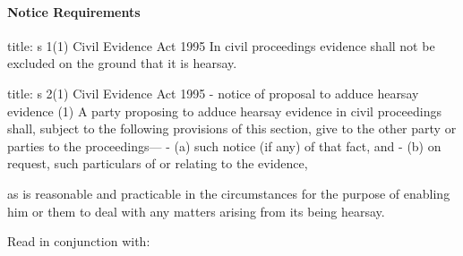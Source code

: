 \documentclass[
]{article}
\newenvironment{Shaded}{}{}
\newcommand{\NormalTok}[1]{#1}
\begin{document}
\hypertarget{notice-requirements}{%
\paragraph{Notice Requirements}\label{notice-requirements}}

\begin{Shaded}
\begin{Highlighting}[]
\NormalTok{title: s 1(1) Civil Evidence Act 1995}
\NormalTok{In civil proceedings evidence shall not be excluded on the ground that it is hearsay.}
\end{Highlighting}
\end{Shaded}

\begin{Shaded}
\begin{Highlighting}[]
\NormalTok{title: s 2(1) Civil Evidence Act 1995 {-} notice of proposal to adduce hearsay evidence}
\NormalTok{(1) A party proposing to adduce hearsay evidence in civil proceedings shall, subject to the following provisions of this section, give to the other party or parties to the proceedings—}
\NormalTok{{-} (a) such notice (if any) of that fact, and}
\NormalTok{{-} (b) on request, such particulars of or relating to the evidence,}

\NormalTok{as is reasonable and practicable in the circumstances for the purpose of enabling him or them to deal with any matters arising from its being hearsay. }
\end{Highlighting}
\end{Shaded}

Read in conjunction with:
\end{document}
